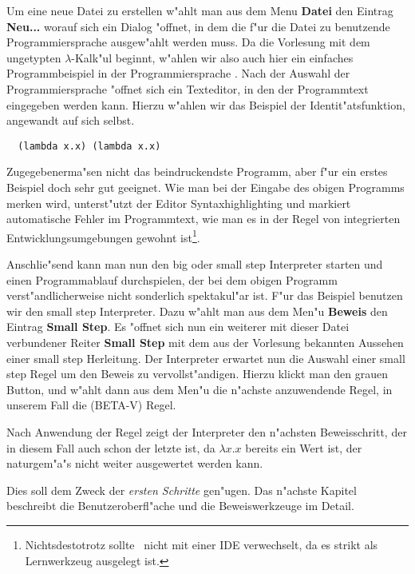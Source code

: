 Um eine neue Datei zu erstellen w"ahlt man aus dem Menu {\bf Datei} den Eintrag {\bf Neu...}
worauf sich ein Dialog "offnet, in dem die f"ur die Datei zu benutzende Programmiersprache
ausgew"ahlt werden muss. Da die Vorlesung mit dem ungetypten $\lambda$-Kalk"ul beginnt,
w"ahlen wir also auch hier ein einfaches Programmbeispiel in der Programmiersprache \LZERO.
Nach der Auswahl der Programmiersprache "offnet sich ein Texteditor, in den der Programmtext
eingegeben werden kann. Hierzu w"ahlen wir das Beispiel der Identit"atsfunktion, angewandt
auf sich selbst.
\begin{verbatim}
  (lambda x.x) (lambda x.x)
\end{verbatim}
Zugegebenerma"sen nicht das beindruckendste Programm, aber f"ur ein erstes Beispiel doch
sehr gut geeignet. Wie man bei der Eingabe des obigen Programms merken wird, unterst"utzt
der Editor Syntaxhighlighting und markiert automatische Fehler im Programmtext, wie man
es in der Regel von integrierten Entwicklungsumgebungen gewohnt ist\footnote{Nichtsdestotrotz
sollte \TPML\ nicht mit einer IDE verwechselt, da es strikt als Lernwerkzeug ausgelegt ist.}.

Anschlie"send kann man nun den big oder small step Interpreter starten und einen Programmablauf
durchspielen, der bei dem obigen Programm verst"andlicherweise nicht sonderlich spektakul"ar
ist. F"ur das Beispiel benutzen wir den small step Interpreter. Dazu w"ahlt man aus dem
Men"u {\bf Beweis} den Eintrag {\bf Small Step}. Es "offnet sich nun ein weiterer mit dieser
Datei verbundener Reiter {\bf Small Step} mit dem aus der Vorlesung bekannten Aussehen einer
small step Herleitung. Der Interpreter erwartet nun die Auswahl einer small step Regel um den
Beweis zu vervollst"andigen. Hierzu klickt man den grauen Button, und w"ahlt dann aus
dem Men"u die n"achste anzuwendende Regel, in unserem Fall die (BETA-V) Regel.

Nach Anwendung der Regel zeigt der Interpreter den n"achsten Beweisschritt, der in diesem
Fall auch schon der letzte ist, da $\lambda x.x$ bereits ein Wert ist, der naturgem"a"s
nicht weiter ausgewertet werden kann.

Dies soll dem Zweck der \emph{ersten Schritte} gen"ugen. Das n"achste Kapitel beschreibt
die Benutzeroberfl"ache und die Beweiswerkzeuge im Detail.



